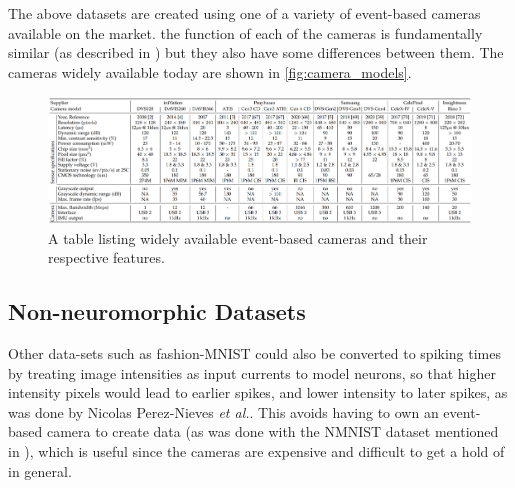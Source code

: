 The above datasets are created using one of a variety of event-based cameras available on the market. the function of each of the cameras is fundamentally similar (as described in ) but they also have some differences between them. The cameras widely available today are shown in \autoref{fig:camera_models}.

\begin{figure}[htb]
      \centering
      \includegraphics[width=\textwidth]{background/images/camera_models.png}
      \caption{A table listing widely available event-based cameras and their respective features\cite{EventBasedVisionASurvery}.}
      \label{fig:camera_models}
\end{figure}

\subsection{Non-neuromorphic Datasets}

Other data-sets such as fashion-MNIST could also be converted to spiking times by treating image intensities as input currents to model neurons, so that higher intensity pixels would lead to earlier spikes, and lower intensity to later spikes, as was done by Nicolas Perez-Nieves \textit{et al.}\cite{NeuralHetroPromRobLearn}. This avoids having to own an event-based camera to create data (as was done with the NMNIST dataset mentioned in ), which is useful since the cameras are expensive and difficult to get a hold of in general.
